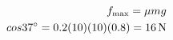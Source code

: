 \documentclass[preview]{standalone}
\begin{document}
\begin{align*}
\special{dvisvgm:raw <g id='unique000'>}f_{\mathrm{max}} = \mu mg \\cos 37^{\circ} = 0.2(10)(10)(0.8) = 16\,\mathrm{N}\special{dvisvgm:raw </g>}
\end{align*}
\end{document}
